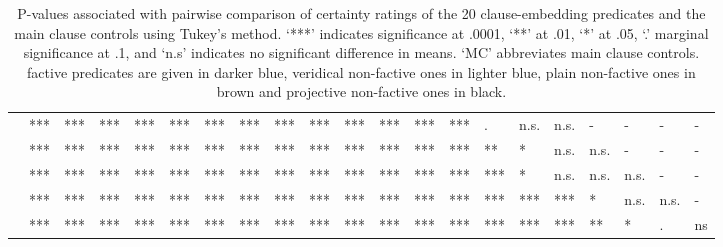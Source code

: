 \documentclass[11pt,fleqn]{article}
\newcommand{\6}{\mbox{$[\hspace*{-.6mm}[$}}
\newcommand{\9}{\mbox{$]\hspace*{-.6mm}]$}}
\begin{document}
\begin{table}[h!]
\begin{tabular}{l l l l l l l l l l l l l l l l l l l l l }
\color{violet}{\em discover}\color{black}	& ***		& *** & *** & *** & *** & *** & *** & *** & *** & *** &  ***  &  ***  &  ***  & . & n.s. & n.s. & - & - & - & - \\
\color{orange}{\em inform}\color{black}		&***		& *** & *** & *** & *** & *** & *** & *** & *** & *** & *** & *** &  ***  & ** & * & n.s. & n.s. & - & - & - \\
\color{violet}{\em see}\color{black}		&***		& *** & *** & *** & *** & *** & *** & *** & *** & *** & *** &  ***  &  ***  &  ***  & * & n.s. & n.s. & n.s. & - & - \\
\color{violet}{\em know}\color{black}		&***		& *** & *** & *** & *** & *** & *** & *** & *** & *** & *** & *** & *** & *** & *** & *** & * & n.s. & n.s. & -  \\
\color{violet}{\em be annoyed}\color{black}	&***		& *** & *** & *** & *** & *** & *** & *** & *** & ***  & ***  & *** & *** & *** & *** & *** & ** & * & . & ns  \\

\bottomrule
\end{tabular}
\caption{P-values associated with pairwise comparison of certainty ratings of the 20 clause-embedding predicates and the main clause controls using Tukey's method. `***' indicates significance at .0001, `**' at .01, `*' at .05, `.' marginal significance at .1, and `n.s' indicates no significant difference in means. `MC' abbreviates main clause controls. factive predicates are given in darker blue, veridical non-factive ones in lighter blue, plain non-factive ones in brown and projective non-factive ones in black.}\label{t-pairwise-proj}
\end{table} 
\end{document}
